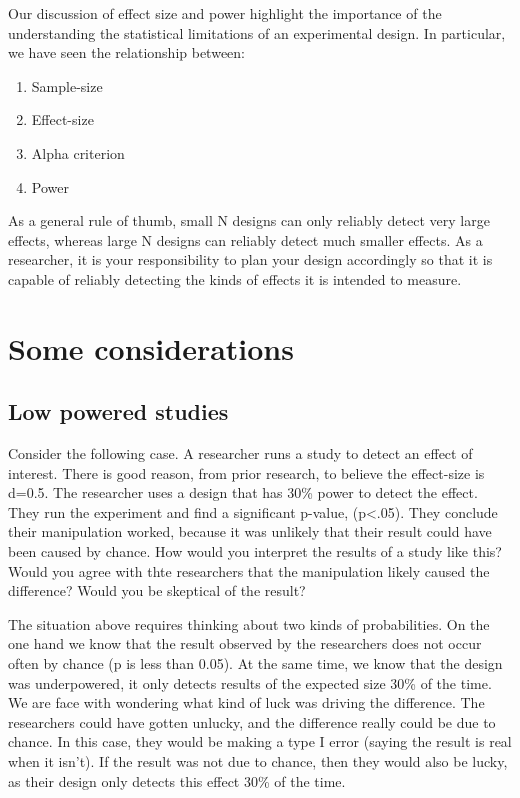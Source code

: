 \documentclass[
]{book}
\providecommand{\tightlist}{%
  \setlength{\itemsep}{0pt}\setlength{\parskip}{0pt}}
\begin{document}
Our discussion of effect size and power highlight the importance of the understanding the statistical limitations of an experimental design. In particular, we have seen the relationship between:

\begin{enumerate}
\def\labelenumi{\arabic{enumi}.}
\tightlist
\item
  Sample-size
\item
  Effect-size
\item
  Alpha criterion
\item
  Power
\end{enumerate}

As a general rule of thumb, small N designs can only reliably detect very large effects, whereas large N designs can reliably detect much smaller effects. As a researcher, it is your responsibility to plan your design accordingly so that it is capable of reliably detecting the kinds of effects it is intended to measure.

\section{Some considerations}\label{some-considerations}

\subsection{Low powered studies}\label{low-powered-studies}

Consider the following case. A researcher runs a study to detect an effect of interest. There is good reason, from prior research, to believe the effect-size is d=0.5. The researcher uses a design that has 30\% power to detect the effect. They run the experiment and find a significant p-value, (p\textless.05). They conclude their manipulation worked, because it was unlikely that their result could have been caused by chance. How would you interpret the results of a study like this? Would you agree with thte researchers that the manipulation likely caused the difference? Would you be skeptical of the result?

The situation above requires thinking about two kinds of probabilities. On the one hand we know that the result observed by the researchers does not occur often by chance (p is less than 0.05). At the same time, we know that the design was underpowered, it only detects results of the expected size 30\% of the time. We are face with wondering what kind of luck was driving the difference. The researchers could have gotten unlucky, and the difference really could be due to chance. In this case, they would be making a type I error (saying the result is real when it isn't). If the result was not due to chance, then they would also be lucky, as their design only detects this effect 30\% of the time.
\end{document}
